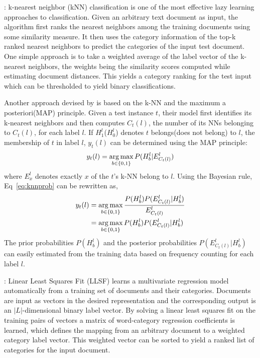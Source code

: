  : k-nearest neighbor (kNN) classification is 
one of the most effective lazy learning approaches to classification. 
Given an arbitrary text document as input, the algorithm first ranks 
the nearest neighbors among the training documents using some 
similarity measure. It then uses the category information of the top-k 
ranked nearest neighbors to predict the categories of the input test 
document. One simple approach is to take a weighted average of the 
label vector of the k-nearest neighbors, the weights being the similarity 
scores computed while estimating document distances. This yields a 
category ranking for the test input which can be thresholded to yield 
binary classifications.

Another approach devised by \citet{zhang2007ml} is based on the k-NN and the maximum a posteriori(MAP) principle. Given a test instance $t$, their model first identifies its k-nearest neighbors and then computes $C_{t}(l)$, the number of its NNs belonging to $C_{t}(l)$, for each label $l$. If $H^{l}_{1}$($H^{l}_{0}$) denotes $t$ belongs(does not belong) to $l$, the membership of $t$ in label $l$, $y_{t}(l)$ can be determined using the MAP principle:
\begin{equation}
\label{eq:knnprob}
y_{t}(l) = \operatorname*{arg\,max}_{b \in \{0, 1\}} P(H^{l}_{b}|E^{l}_{C_{t}(l)})
\end{equation}
where $E^{l}_{x}$ denotes exactly $x$ of the $t$'s k-NN belong to $l$. Using the Bayesian rule, Eq~\ref{eq:knnprob} can be rewritten as,
\begin{align}
y_{t}(l) &= \operatorname*{arg\,max}_{b \in \{0, 1\}} \frac{ P(H^{l}_{b}) P(E^{l}_{C_{t}(l)} | H^{l}_{b}) } {E^{l}_{C_{t}(l)}} \\
&= \operatorname*{arg\,max}_{b \in \{0, 1\}} P(H^{l}_{b}) P(E^{l}_{C_{t}(l)} | H^{l}_{b})
\end{align}
The prior probabilities $P(H^{l}_{b})$ and the posterior probabilities $P(E^{l}_{C_{t}(l)} | H^{l}_{b})$ can easily estimated from the training data based on frequency counting for each label $l$.



 : Linear Least Squares Fit (LLSF) \citep{yang1992linear} learns a multivariate regression model automatically from a training set of documents and their categories. Documents are input as vectors in the desired representation and the corresponding output is an $|L|$-dimensional binary label vector. By solving a linear least squares fit on the training pairs of vectors a matrix of word-category regression coefficients is learned, which defines the mapping from an arbitrary document to a weighted category label vector. This weighted vector can be sorted to yield a ranked list of categories for the input document.

